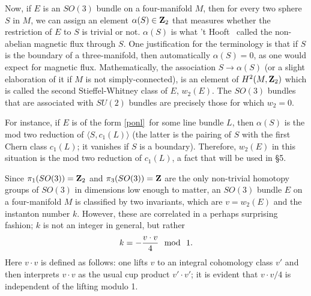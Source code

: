 \documentclass[12pt]{article}
\numberwithin{equation}{section}
\begin{document}
Now, if $E$ is an $SO(3)$ bundle on a four-manifold
$M$, then for every two sphere $S$ in $M$, we can assign an element
$\alpha(S)\in {\bf Z}_2$ that measures whether the restriction of $E$ to $S$
is trivial or not.
$\alpha(S)$ is what 't Hooft
\cite{thooft}\ called the non-abelian magnetic flux through
$S$.  One justification for the terminology is that
if $S$ is the boundary of a three-manifold, then
automatically $\alpha(S)=0$, as one would expect for magnetic flux.
Mathematically, the association $S\to \alpha(S)$ (or a slight elaboration
of it if $M$ is not simply-connected), is an element of
$H^2(M,{\bf Z}_2)$ which is called the second Stieffel-Whitney class
of $E$, $w_2(E)$.
The $SO(3)$ bundles that are associated with $SU(2)$
bundles are precisely those for which $w_2=0$.

For instance, if $E$ is of the form \eqref{ponl}\ for some line bundle $L$,
then $\alpha(S)$ is the mod two reduction of $\langle S,c_1(L)\rangle$
(the latter is the pairing of $S$ with the first Chern class $c_1(L)$;
it vanishes if $S$ is a boundary).  Therefore, $w_2(E)$ in this
situation is the mod two reduction of $c_1(L)$, a fact that will
be used in \S5.

Since $\pi_1(SO(3))={\bf Z}_2$ and $\pi_3(SO(3))={\bf Z}$ are the
only non-trivial homotopy groups of $SO(3)$ in dimensions low enough
to matter, an $SO(3)$ bundle $E$ on a four-manifold $M$ is classified by
two invariants, which are $v=w_2(E)$ and the instanton number $k$.
However, these are correlated in a perhaps surprising fashion; $k$
is not an integer in general, but rather
\begin{equation}
  \label{insno}
  k=-{v\cdot v\over 4}~~{\rm mod}~~1.
\end{equation}
Here $v\cdot v$ is defined as follows: one lifts $v$ to an integral
cohomology class $v'$ and then interprets $v\cdot v$ as the usual cup product
$v'\cdot v'$;
it is evident that $v\cdot v/4$ is independent of the lifting modulo 1.
\end{document}
